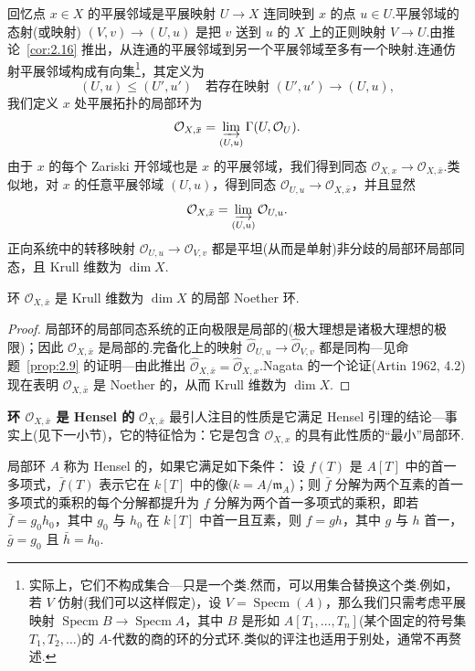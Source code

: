 回忆点 $x \in X$ 的平展邻域是平展映射 $U \to X$ 连同映到 $x$ 的点 $u \in U$.平展邻域的态射(或映射) $(V, v) \to (U, u)$ 是把 $v$ 送到 $u$ 的 $X$ 上的正则映射 $V \to U$.由推论~\ref{cor:2.16} 推出，从连通的平展邻域到另一个平展邻域至多有一个映射.连通仿射平展邻域构成有向集\footnote{实际上，它们不构成集合---只是一个类.然而，可以用集合替换这个类.例如，若 $V$ 仿射(我们可以这样假定)，设 $V = \operatorname{Specm}(A)$，那么我们只需考虑平展映射 $\operatorname{Specm} B \to \operatorname{Specm} A$，其中 $B$ 是形如 $A[T_1, \ldots, T_n]$(某个固定的符号集 $T_1, T_2, \ldots$)的 $A$-代数的商的环的分式环.类似的评注也适用于别处，通常不再赘述.}，其定义为
\[
(U, u) \leq (U', u') \quad \text{若存在映射 } (U', u') \to (U, u),
\]
我们定义 $x$ 处平展拓扑的局部环为
\[
\mathcal{O}_{X, \bar{x}} = \varinjlim_{(U, u)} \Gamma(U, \mathcal{O}_U).
\]
由于 $x$ 的每个 Zariski 开邻域也是 $x$ 的平展邻域，我们得到同态 $\mathcal{O}_{X, x} \to \mathcal{O}_{X, \bar{x}}$.类似地，对 $x$ 的任意平展邻域 $(U, u)$，得到同态 $\mathcal{O}_{U, u} \to \mathcal{O}_{X, \bar{x}}$，并且显然
\[
\mathcal{O}_{X, \bar{x}} = \varinjlim_{(U, u)} \mathcal{O}_{U, u}.
\]
正向系统中的转移映射 $\mathcal{O}_{U, u} \to \mathcal{O}_{V, v}$ 都是平坦(从而是单射)非分歧的局部环局部同态，且 Krull 维数为 $\dim X$.

\begin{proposition}\label{prop:4.1}
环 $\mathcal{O}_{X, \bar{x}}$ 是 Krull 维数为 $\dim X$ 的局部 Noether 环.
\end{proposition}

\begin{proof}
局部环的局部同态系统的正向极限是局部的(极大理想是诸极大理想的极限)；因此 $\mathcal{O}_{X, \bar{x}}$ 是局部的.完备化上的映射 $\widehat{\mathcal{O}}_{U, u} \to \widehat{\mathcal{O}}_{V, v}$ 都是同构---见命题~\ref{prop:2.9} 的证明---由此推出 $\widehat{\mathcal{O}}_{X, \bar{x}} = \widehat{\mathcal{O}}_{X, x}$.Nagata 的一个论证(Artin 1962, 4.2)现在表明 $\mathcal{O}_{X, \bar{x}}$ 是 Noether 的，从而 Krull 维数为 $\dim X$.
\end{proof}

\textbf{环 $\mathcal{O}_{X, \bar{x}}$ 是 Hensel 的} $\mathcal{O}_{X, \bar{x}}$ 最引人注目的性质是它满足 Hensel 引理的结论---事实上(见下一小节)，它的特征恰为：它是包含 $\mathcal{O}_{X, x}$ 的具有此性质的``最小''局部环.

\begin{definition}\label{def:4.2}
局部环 $A$ 称为 Hensel 的，如果它满足如下条件：
设 $f(T)$ 是 $A[T]$ 中的首一多项式，$\bar{f}(T)$ 表示它在 $k[T]$ 中的像($k = A/\mathfrak{m}_{A}$)；则 $\bar{f}$ 分解为两个互素的首一多项式的乘积的每个分解都提升为 $f$ 分解为两个首一多项式的乘积，即若 $\bar{f} = g_0h_0$，其中 $g_0$ 与 $h_0$ 在 $k[T]$ 中首一且互素，则 $f = gh$，其中 $g$ 与 $h$ 首一，$\bar{g} = g_0$ 且 $\bar{h} = h_0$.
\end{definition}

